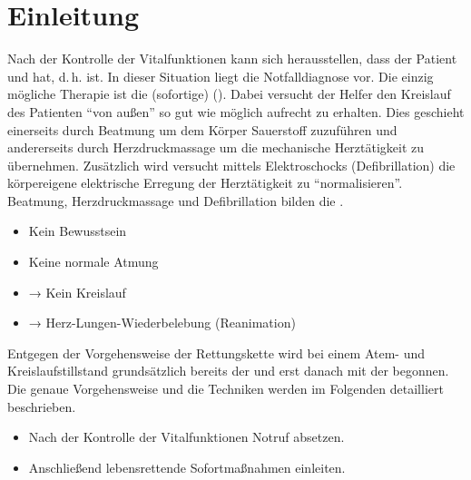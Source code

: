 \clearpage
\section{Einleitung}

{Nach der Kontrolle der Vitalfunktionen kann sich
herausstellen, dass der Patient  und
 hat, d.\,h.  ist. In dieser Situation liegt die
Notfalldiagnose
 vor. Die einzig
mögliche Therapie ist die (sofortige)
 (). Dabei
versucht der Helfer den Kreislauf des Patienten \enquote{von
außen} so gut wie möglich aufrecht zu
erhalten. Dies geschieht einerseits durch Beatmung um dem
Körper Sauerstoff zuzuführen und andererseits durch
Herzdruckmassage um die mechanische Herztätigkeit zu
übernehmen. Zusätzlich wird versucht mittels Elektroschocks
(Defibrillation) die körpereigene elektrische Erregung der
Herztätigkeit zu \enquote{normalisieren}.
Beatmung, Herzdruckmassage und Defibrillation
bilden die .}{
\begin{itemize}
  \item Kein Bewusstsein
  \item Keine normale Atmung
  \item → Kein Kreislauf
  \item → Herz-Lungen-Wiederbelebung (Reanimation)
\end{itemize}
}{}{}{}

{Entgegen der Vorgehensweise der Rettungskette wird bei
einem Atem- und Kreislaufstillstand grundsätzlich bereits
 der  und erst danach mit der  begonnen. Die genaue Vorgehensweise und die
Techniken werden im Folgenden detailliert beschrieben.
\bigskip }{
\begin{itemize}
  \item Nach der Kontrolle der Vitalfunktionen Notruf absetzen.
  \item Anschließend lebensrettende Sofortmaßnahmen einleiten.
\end{itemize}
}{}{}{}


